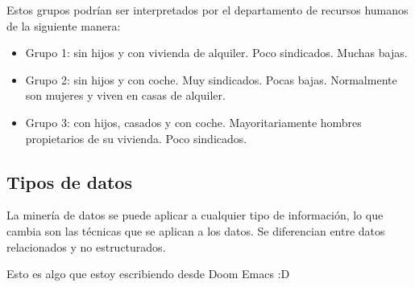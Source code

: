\documentclass{article}
\begin{document}
Estos grupos podrían ser interpretados por el departamento de recursos humanos de la siguiente manera:
\begin{itemize}
\item Grupo 1: sin hijos y con vivienda de alquiler. Poco sindicados. Muchas bajas.
\item Grupo 2: sin hijos y con coche. Muy sindicados. Pocas bajas. Normalmente son mujeres y viven en casas de alquiler.
\item Grupo 3: con hijos, casados y con coche. Mayoritariamente hombres propietarios de su vivienda. Poco sindicados.
\end{itemize}


\subsection{Tipos de datos}

La minería de datos se puede aplicar a cualquier tipo de información, lo que cambia son las técnicas que se aplican a los datos. Se diferencian entre datos relacionados y no estructurados.

Esto es algo que estoy escribiendo desde Doom Emacs :D
\end{document}

